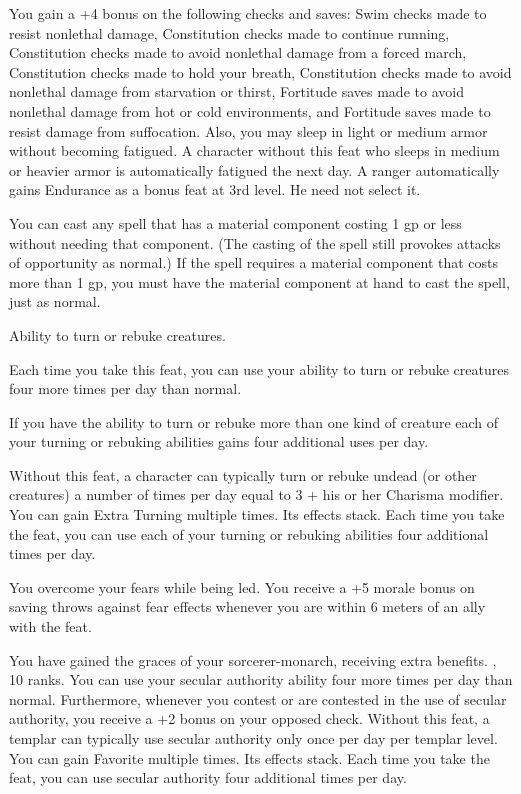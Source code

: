 {}
{You gain a +4 bonus on the following checks and saves: Swim checks made to resist nonlethal damage, Constitution checks made to continue running, Constitution checks made to avoid nonlethal damage from a forced march, Constitution checks made to hold your breath, Constitution checks made to avoid nonlethal damage from starvation or thirst, Fortitude saves made to avoid nonlethal damage from hot or cold environments, and Fortitude saves made to resist damage from suffocation. Also, you may sleep in light or medium armor without becoming fatigued.}
{A character without this feat who sleeps in medium or heavier armor is automatically fatigued the next day.}{}
{A ranger automatically gains Endurance as a bonus feat at 3rd level. He need not select it.}

{You can cast any spell that has a material component costing 1 gp or less without needing that component. (The casting of the spell still provokes attacks of opportunity as normal.) If the spell requires a material component that costs more than 1 gp, you must have the material component at hand to cast the spell, just as normal.}

{}
{Ability to turn or rebuke creatures.}
{Each time you take this feat, you can use your ability to turn or rebuke creatures four more times per day than normal.

If you have the ability to turn or rebuke more than one kind of creature each of your turning or rebuking abilities gains four additional uses per day.}
{Without this feat, a character can typically turn or rebuke undead (or other creatures) a number of times per day equal to 3 + his or her Charisma modifier.}
{You can gain Extra Turning multiple times. Its effects stack. Each time you take the feat, you can use each of your turning or rebuking abilities four additional times per day.}

{You overcome your fears while being led.}{}
{You receive a +5 morale bonus on saving throws against fear effects whenever you are within 6 meters of an ally with the  feat.}{}{}

{You have gained the graces of your sorcerer-monarch, receiving extra benefits.}
{,  10 ranks.}
{You can use your secular authority ability four more times per day than normal. Furthermore, whenever you contest or are contested in the use of secular authority, you receive a +2 bonus on your opposed  check.}
{Without this feat, a templar can typically use secular authority only once per day per templar level.}
{You can gain Favorite multiple times. Its effects stack. Each time you take the feat, you can use secular authority four additional times per day.}

